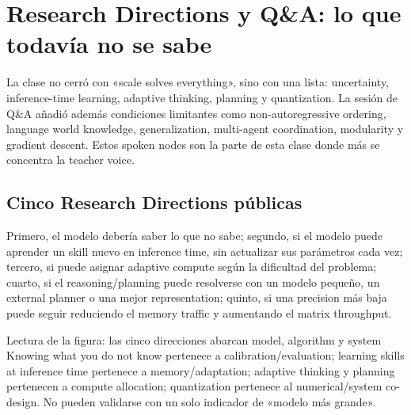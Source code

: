 \section{Research Directions y Q\&A: lo que todavía no se sabe}

La clase no cerró con «scale solves everything», sino con una lista: uncertainty, inference-time learning, adaptive thinking, planning y quantization. La sesión de Q\&A añadió además condiciones limitantes como non-autoregressive ordering, language world knowledge, generalization, multi-agent coordination, modularity y gradient descent. Estos spoken nodes son la parte de esta clase donde más se concentra la teacher voice.

\subsection{Cinco Research Directions públicas}

Primero, el modelo debería saber lo que no sabe; segundo, si el modelo puede aprender un skill nuevo en inference time, sin actualizar sus parámetros cada vez; tercero, si puede asignar adaptive compute según la dificultad del problema; cuarto, si el reasoning/planning puede resolverse con un modelo pequeño, un external planner o una mejor representation; quinto, si una precision más baja puede seguir reduciendo el memory traffic y aumentando el matrix throughput.


\begin{knowledgebox}{Lectura de la figura: las cinco direcciones abarcan model, algorithm y system}
Knowing what you do not know pertenece a calibration/evaluation; learning skills at inference time pertenece a memory/adaptation; adaptive thinking y planning pertenecen a compute allocation; quantization pertenece al numerical/system co-design. No pueden validarse con un solo indicador de «modelo más grande».
\end{knowledgebox}


